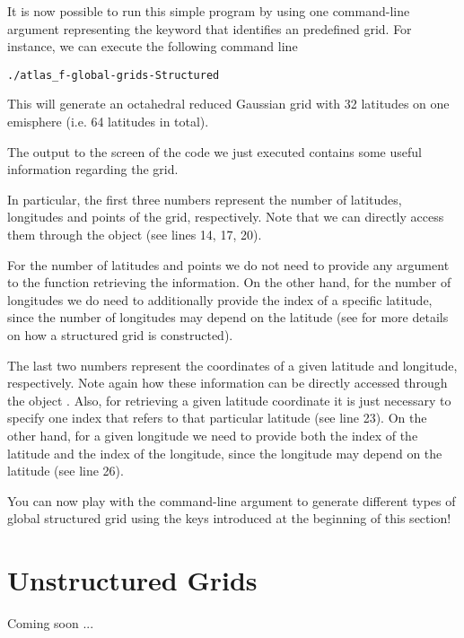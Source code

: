 It is now possible to run this simple program by using 
one command-line argument representing the keyword that 
identifies an \Atlas predefined grid. For instance, we 
can execute the following command line 
%
\begin{lstlisting}[style=BashStyle]
./atlas_f-global-grids-Structured
\end{lstlisting}
% 
This will generate an octahedral reduced Gaussian grid 
with 32 latitudes on one emisphere (i.e. 64 latitudes 
in total).

The output to the screen of the code we just executed 
contains some useful information regarding the grid.

In particular, the first three numbers represent the 
number of latitudes, longitudes and points of the grid,
respectively. Note that we can directly access them 
through the  object (see lines 14, 17, 20).
%
\begin{tipbox}
For the number of latitudes and points we do not need to provide
any argument to the function retrieving the information. On the 
other hand, for the number of longitudes we do need to additionally 
provide the index of a specific latitude, since the number of 
longitudes may depend on the latitude (see  
for more details on how a structured grid is constructed). 
\end{tipbox}
%
The last two numbers represent the coordinates of a given 
latitude and longitude, respectively. Note again how these 
information can be directly accessed through the object 
. 
Also, for retrieving a given latitude coordinate it is just 
necessary to specify one index that refers to that particular 
latitude (see line 23). On the other hand, for a given longitude 
we need to provide both the index of the latitude and the index 
of the longitude, since the longitude may depend on the latitude 
(see line 26).

You can now play with the command-line argument to generate 
different types of global structured grid using the keys introduced 
at the beginning of this section!



\section{Unstructured Grids}
Coming soon ...
